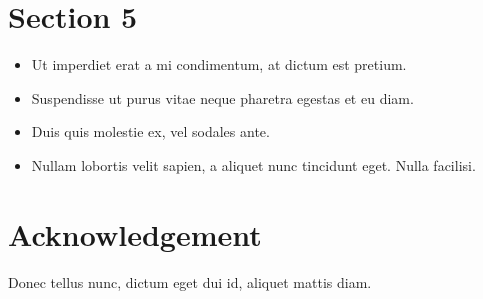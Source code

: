 \documentclass{tudelftposter}
\begin{document}
\section{Section 5}

\begin{itemize}

\item Ut imperdiet erat a mi condimentum, at dictum est pretium.

\item Suspendisse ut purus vitae neque pharetra egestas et eu diam.

\item Duis quis molestie ex, vel sodales ante.

\item Nullam lobortis velit sapien, a aliquet nunc tincidunt eget. Nulla facilisi.

\end{itemize}

\vspace{1cm}

\section{Acknowledgement}
Donec tellus nunc, dictum eget dui id, aliquet mattis diam.
\end{document}
